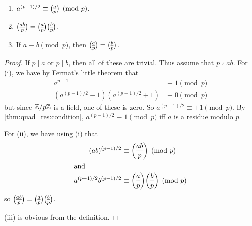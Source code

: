 \begin{proposition} \label{thm:legendre} \leavevmode
    \begin{enumerate}
        \item $a^{(p - 1)/2} \equiv \lgnd{a}{p} \pmod p$.
            \label{thm:legendre:p-1}
        \item $\lgnd{ab}{p} = \lgnd{a}{p} \lgnd{b}{p}$.
            \label{thm:legendre:product}
        \item If $a \equiv b \pmod p$, then $\lgnd{a}{p} = \lgnd{b}{p}$.
            \label{thm:legendre:congruence}
    \end{enumerate}
\end{proposition}
\begin{proof}
    If $p \mid a$ or $p \mid b$, then all of these are trivial.
    Thus assume that $p \nmid ab$.
    For (i), we have by Fermat's little theorem that \begin{align*}
        a^{p - 1} &\equiv 1 \pmod p \\
        (a^{(p - 1)/2} - 1)(a^{(p - 1)/2} + 1) &\equiv 0 \pmod p
    \end{align*} but since $\mathbb{Z}/p\mathbb{Z}$ is a field,
    one of these is zero.
    So $a^{(p - 1)/2} \equiv \pm 1 \pmod p$.
    By \cref{thm:quad_res:condition}, $a^{(p - 1)/2} \equiv 1 \pmod p$
    iff $a$ is a residue modulo $p$.

    For (ii), we have using (i) that \begin{align*}
        (ab)^{(p - 1)/2} &\equiv \lgnd{ab}{p} \pmod p \\
        \shortintertext{and}
        a^{(p - 1)/2} b^{(p - 1)/2} &\equiv \lgnd{a}{p} \lgnd{b}{p} \pmod p
    \end{align*} so $\lgnd{ab}{p} = \lgnd{a}{p} \lgnd{b}{p}$.

    (iii) is obvious from the definition.
\end{proof}

